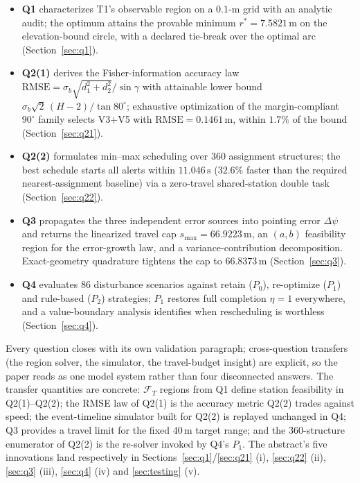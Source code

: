 \begin{itemize}\setlength{\itemsep}{2pt}
\item \textbf{Q1} characterizes T1's observable region on a $0.1$-m grid with an
analytic audit; the optimum attains the provable minimum $r^{*}=7.5821\,\mathrm{m}$ on
the elevation-bound circle, with a declared tie-break over the optimal arc
(Section~\ref{sec:q1}).
\item \textbf{Q2(1)} derives the Fisher-information accuracy law
$\mathrm{RMSE}=\sigma_b\sqrt{d_1^2+d_2^2}/\sin\gamma$ with attainable lower bound
$\sigma_b\sqrt{2}\,(H-2)/\tan80^\circ$; exhaustive optimization of the margin-compliant
$90^\circ$ family selects V3+V5 with
$\mathrm{RMSE}=0.1461\,\mathrm{m}$, within $1.7\%$ of the bound (Section~\ref{sec:q21}).
\item \textbf{Q2(2)} formulates min--max scheduling over 360 assignment structures; the
best schedule starts all alerts within $11.046\,\mathrm{s}$ ($32.6\%$ faster than the
required nearest-assignment baseline) via a zero-travel shared-station double task
(Section~\ref{sec:q22}).
\item \textbf{Q3} propagates the three independent error sources into pointing error
$\Delta\psi$ and returns the linearized travel cap $s_{\max}=66.9223\,\mathrm{m}$, an
$(a,b)$ feasibility region for the error-growth law, and a variance-contribution
decomposition. Exact-geometry quadrature tightens the cap to $66.8373\,\mathrm{m}$
(Section~\ref{sec:q3}).
\item \textbf{Q4} evaluates 86 disturbance scenarios against retain ($P_0$),
re-optimize ($P_1$) and rule-based ($P_2$) strategies; $P_1$ restores full completion
$\eta=1$ everywhere, and a value-boundary analysis identifies when rescheduling is
worthless (Section~\ref{sec:q4}).
\end{itemize}

Every question closes with its own validation paragraph; cross-question transfers (the
region solver, the simulator, the travel-budget insight) are explicit, so the paper reads
as one model system rather than four disconnected answers. The transfer quantities are
concrete: $\mathcal{F}_{T}$ regions from Q1 define station feasibility in Q2(1)--Q2(2);
the RMSE law of Q2(1) is the accuracy metric Q2(2) trades against speed; the
event-timeline simulator built for Q2(2) is replayed unchanged in Q4; Q3 provides a
travel limit for the fixed $40\,\mathrm{m}$ target range; and the
360-structure enumerator of Q2(2) is the re-solver invoked by Q4's $P_1$. The abstract's
five innovations land respectively in Sections~\ref{sec:q1}/\ref{sec:q21} (i),
\ref{sec:q22} (ii), \ref{sec:q3} (iii), \ref{sec:q4} (iv) and \ref{sec:testing} (v).
